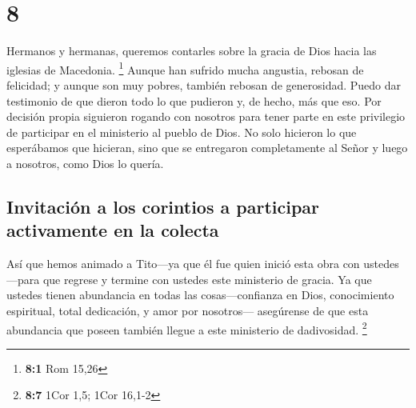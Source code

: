 \hypertarget{section-7}{%
\section{8}\label{section-7}}

 Hermanos y hermanas, queremos contarles sobre la gracia
de Dios hacia las iglesias de Macedonia. \footnote{\textbf{8:1} Rom
  15,26}  Aunque han sufrido mucha angustia, rebosan de
felicidad; y aunque son muy pobres, también rebosan de generosidad.
 Puedo dar testimonio de que dieron todo lo que pudieron
y, de hecho, más que eso. Por decisión propia  siguieron
rogando con nosotros para tener parte en este privilegio de participar
en el ministerio al pueblo de Dios.  No solo hicieron lo
que esperábamos que hicieran, sino que se entregaron completamente al
Señor y luego a nosotros, como Dios lo quería.

\hypertarget{invitaciuxf3n-a-los-corintios-a-participar-activamente-en-la-colecta}{%
\subsection{Invitación a los corintios a participar activamente en la
colecta}\label{invitaciuxf3n-a-los-corintios-a-participar-activamente-en-la-colecta}}

 Así que hemos animado a Tito---ya que él fue quien inició
esta obra con ustedes---para que regrese y termine con ustedes este
ministerio de gracia.  Ya que ustedes tienen abundancia en
todas las cosas---confianza en Dios, conocimiento espiritual, total
dedicación, y amor por nosotros--- asegúrense de que esta abundancia que
poseen también llegue a este ministerio de dadivosidad. \footnote{\textbf{8:7}
  1Cor 1,5; 1Cor 16,1-2}

